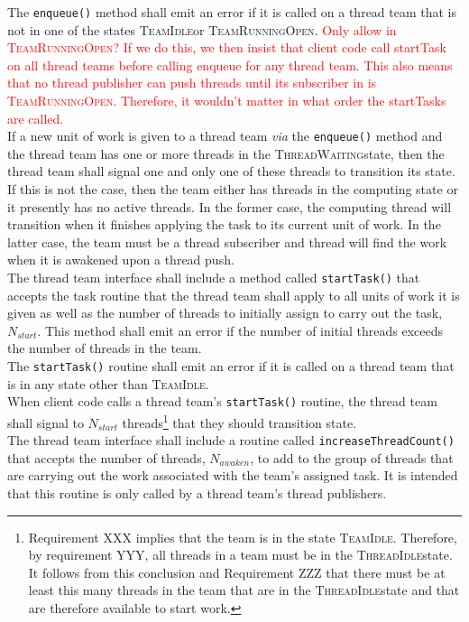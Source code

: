 \documentclass{article}
\newcommand{\TeamIdle}          {\textsc{TeamIdle}}
\newcommand{\TeamRunningOpen}   {\textsc{TeamRunningOpen}}
\newcommand{\ThreadIdle}        {\textsc{ThreadIdle}}
\newcommand{\ThreadWaiting}     {\textsc{ThreadWaiting}}
\begin{document}
The \texttt{enqueue()} method shall emit an error if it is called on a thread
team that is not in one of the states \TeamIdle or \TeamRunningOpen.
\textcolor{red}{Only allow in \TeamRunningOpen?  If we do this, we then insist
that client code call startTask on all thread teams before calling enqueue for
any thread team.  This also means that no thread publisher can push threads
until its subscriber in is \TeamRunningOpen.  Therefore, it wouldn't matter in
what order the startTasks are called.}\\

If a new unit of work is given to a thread team \textit{via} the
\texttt{enqueue()} method and the thread team has one or more threads in the
\ThreadWaiting state, then the thread team shall signal one and only one of
these threads to transition its state.  If this is not the case, then the team
either has threads in the computing state or it presently has no active threads.
In the former case, the computing thread will transition when it finishes
applying the task to its current unit of work.  In the latter case, the team
must be a thread subscriber and thread will find the work when it is awakened
upon a thread push.\\

The thread team interface shall include a method called \texttt{startTask()}
that accepts the task routine that the thread team shall apply to all units of
work it is given as well as the number of threads to initially assign to carry
out the task, $N_{start}$.  This method shall emit an error if the number of
initial threads exceeds the number of threads in the team.\\

The \texttt{startTask()} routine shall emit an error if it is called on a thread
team that is in any state other than \TeamIdle.\\

When client code calls a thread team's \texttt{startTask()} routine, the thread
team shall signal to $N_{start}$ threads\footnote{Requirement XXX implies that
the team is in the state \TeamIdle.  Therefore, by requirement YYY, all threads
in a team must be in the \ThreadIdle state.  It follows from this conclusion and
Requirement ZZZ that there must be at least this many threads in the team that
are in the \ThreadIdle state and that are therefore available to start work.}
that they should transition state.\\

The thread team interface shall include a routine called
\texttt{increaseThreadCount()} that accepts the number of threads, $N_{awaken}$,
to add to the group of threads that are carrying out the work associated with
the team's assigned task.  It is intended that this routine is only called by a
thread team's thread publishers.\\
\end{document}
